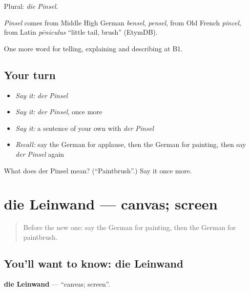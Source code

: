 Plural: \emph{die Pinsel}.

\begin{cousinweb}
\emph{Pinsel} comes from Middle High German \emph{bensel}, \emph{pensel}, from Old French \emph{pincel}, from Latin \emph{pēniculus} \textquotedblleft{}little tail, brush\textquotedblright{} (EtymDB).
\end{cousinweb}

\begin{grammarlens}[title={What you've built}]
One more word for telling, explaining and describing at B1.
\end{grammarlens}

\subsection*{Your turn}
\begin{itemize}
\raggedright
  \item \emph{Say it:} \emph{der Pinsel}
  \item \emph{Say it:} \emph{der Pinsel}, once more
  \item \emph{Say it:} a sentence of your own with \emph{der Pinsel}
  \item \emph{Recall:} say the German for applause, then the German for painting, then say \emph{der Pinsel} again
\end{itemize}

\begin{tcolorbox}[breakable,colback=teal!4,colframe=teal!35!black,title={Before you move on}]
What does der Pinsel mean? (\textquotedblleft{}Paintbrush\textquotedblright{}.) Say it once more.
\end{tcolorbox}
\section[die Leinwand]{die Leinwand — canvas; screen}

\label{lesson:GE-C518-leinwand}



\begin{quote}
Before the new one: say the German for painting, then the German for paintbrush.
\end{quote}

\subsection*{You'll want to know: die Leinwand}
\textbf{die Leinwand} — \textquotedblleft{}canvas; screen\textquotedblright{}.

